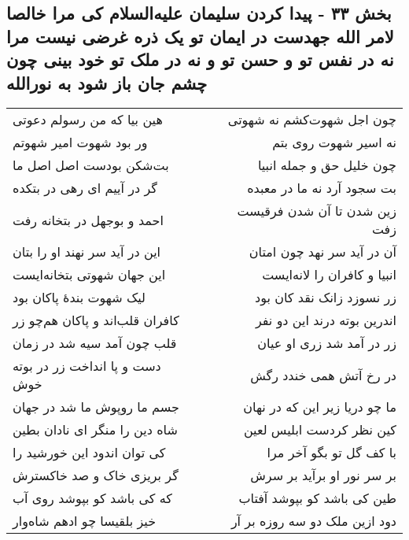 \begin{center}
\section*{بخش ۳۳ - پیدا کردن سلیمان علیه‌السلام کی مرا خالصا لامر الله جهدست در ایمان تو یک ذره غرضی نیست مرا نه در نفس تو و حسن تو و نه در ملک تو خود بینی چون چشم جان باز شود به نورالله}
\label{sec:sh033}
\begin{longtable}{l p{0.5cm} r}
هین بیا که من رسولم دعوتی
&&
چون اجل شهوت‌کشم نه شهوتی
\\
ور بود شهوت امیر شهوتم
&&
نه اسیر شهوت روی بتم
\\
بت‌شکن بودست اصل اصل ما
&&
چون خلیل حق و جمله انبیا
\\
گر در آییم ای رهی در بتکده
&&
بت سجود آرد نه ما در معبده
\\
احمد و بوجهل در بتخانه رفت
&&
زین شدن تا آن شدن فرقیست زفت
\\
این در آید سر نهند او را بتان
&&
آن در آید سر نهد چون امتان
\\
این جهان شهوتی بتخانه‌ایست
&&
انبیا و کافران را لانه‌ایست
\\
لیک شهوت بندهٔ پاکان بود
&&
زر نسوزد زانک نقد کان بود
\\
کافران قلب‌اند و پاکان هم‌چو زر
&&
اندرین بوته درند این دو نفر
\\
قلب چون آمد سیه شد در زمان
&&
زر در آمد شد زری او عیان
\\
دست و پا انداخت زر در بوته خوش
&&
در رخ آتش همی خندد رگش
\\
جسم ما روپوش ما شد در جهان
&&
ما چو دریا زیر این که در نهان
\\
شاه دین را منگر ای نادان بطین
&&
کین نظر کردست ابلیس لعین
\\
کی توان اندود این خورشید را
&&
با کف گل تو بگو آخر مرا
\\
گر بریزی خاک و صد خاکسترش
&&
بر سر نور او برآید بر سرش
\\
که کی باشد کو بپوشد روی آب
&&
طین کی باشد کو بپوشد آفتاب
\\
خیز بلقیسا چو ادهم شاه‌وار
&&
دود ازین ملک دو سه روزه بر آر
\\
\end{longtable}
\end{center}

